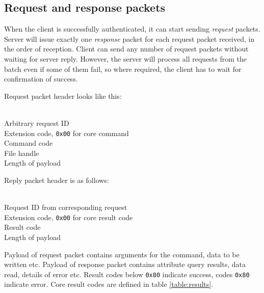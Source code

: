 %

\subsection{Request and response packets}

When the client is successfully authenticated, it can start sending {\it request} packets. Server will issue
exactly one {\it response} packet for each request packet received, in the order of reception. Client can send
any number of request packets without waiting for server reply. However, the server will process all requests
from the batch even if some of them fail, so where required, the client has to wait for confirmation of
success.

\begin{samepage}
Request packet header looks like this:
\begin{description}[parsep=1pt]
	 \hfill \\
		Arbitrary request ID
	 \hfill \\
		Extension code, {\tt 0x00} for core command
	 \hfill \\
		Command code
	 \hfill \\
		File handle
	 \hfill \\
		Length of payload
\end{description}
\end{samepage}

\begin{samepage}
Reply packet header is as follows:
\begin{description}[parsep=1pt]
	 \hfill \\
		Request ID from corresponding request
	 \hfill \\
		Extension code, {\tt 0x00} for core result code
	 \hfill \\
		Result code
	 \hfill \\
		Length of payload
\end{description}
\end{samepage}

Payload of request packet contains arguments for the command, data to be written etc. Payload of response
packet contains attribute query results, data read, details of error etc. Result codes below {\tt 0x80}
indicate success, codes {\tt 0x80} indicate error. Core result codes are defined in table \ref{table:results}.

